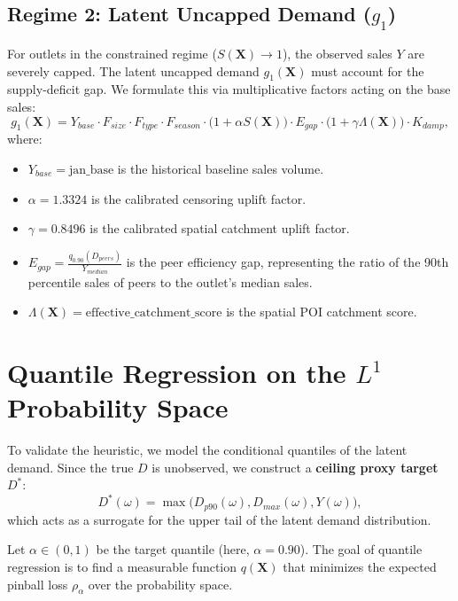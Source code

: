 \documentclass[11pt,a4paper]{article}
\theoremstyle{definition}
\begin{document}
\subsection{Regime 2: Latent Uncapped Demand ($g_1$)}
For outlets in the constrained regime ($S(\bm{X}) \to 1$), the observed sales $Y$ are severely capped. The latent uncapped demand $g_1(\bm{X})$ must account for the supply-deficit gap. We formulate this via multiplicative factors acting on the base sales:
\begin{equation}
    g_1(\bm{X}) = Y_{base} \cdot F_{size} \cdot F_{type} \cdot F_{season} \cdot \big(1 + \alpha S(\bm{X})\big) \cdot E_{gap} \cdot \big(1 + \gamma \Lambda(\bm{X})\big) \cdot K_{damp},
\end{equation}
where:
\begin{itemize}
    \item $Y_{base} = \text{jan\_base}$ is the historical baseline sales volume.
    \item $\alpha = 1.3324$ is the calibrated censoring uplift factor.
    \item $\gamma = 0.8496$ is the calibrated spatial catchment uplift factor.
    \item $E_{gap} = \frac{q_{0.90}(D_{peers})}{Y_{median}}$ is the peer efficiency gap, representing the ratio of the 90th percentile sales of peers to the outlet's median sales.
    \item $\Lambda(\bm{X}) = \text{effective\_catchment\_score}$ is the spatial POI catchment score.
\end{itemize}

\section{Quantile Regression on the $L^1$ Probability Space}
To validate the heuristic, we model the conditional quantiles of the latent demand. Since the true $D$ is unobserved, we construct a \textbf{ceiling proxy target} $D^*$:
\begin{equation}
    D^*(\omega) = \max\big(D_{p90}(\omega), D_{max}(\omega), Y(\omega)\big),
\end{equation}
which acts as a surrogate for the upper tail of the latent demand distribution.

Let $\alpha \in (0,1)$ be the target quantile (here, $\alpha = 0.90$). The goal of quantile regression is to find a measurable function $q(\bm{X})$ that minimizes the expected pinball loss $\rho_\alpha$ over the probability space.
\end{document}
